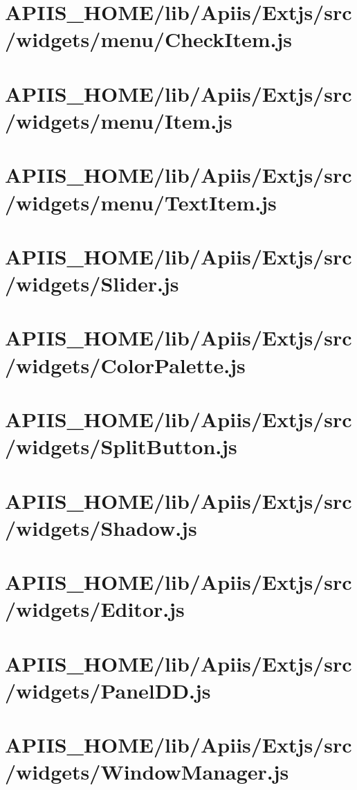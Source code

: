 \section{APIIS\_HOME/lib/Apiis/Extjs/src/widgets/menu/CheckItem.js} 
\section{APIIS\_HOME/lib/Apiis/Extjs/src/widgets/menu/Item.js} 
\section{APIIS\_HOME/lib/Apiis/Extjs/src/widgets/menu/TextItem.js} 
\section{APIIS\_HOME/lib/Apiis/Extjs/src/widgets/Slider.js} 
\section{APIIS\_HOME/lib/Apiis/Extjs/src/widgets/ColorPalette.js} 
\section{APIIS\_HOME/lib/Apiis/Extjs/src/widgets/SplitButton.js} 
\section{APIIS\_HOME/lib/Apiis/Extjs/src/widgets/Shadow.js} 
\section{APIIS\_HOME/lib/Apiis/Extjs/src/widgets/Editor.js} 
\section{APIIS\_HOME/lib/Apiis/Extjs/src/widgets/PanelDD.js} 
\section{APIIS\_HOME/lib/Apiis/Extjs/src/widgets/WindowManager.js} 
